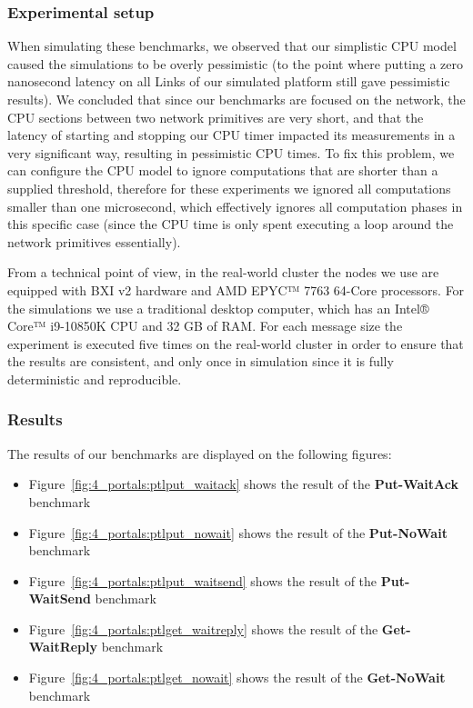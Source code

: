 \subsubsection{Experimental setup}

When simulating these benchmarks, we observed that our simplistic CPU model
caused the simulations to be overly pessimistic (to the point where putting a
zero nanosecond latency on all Links of our simulated platform still gave
pessimistic results). We concluded that since our benchmarks are focused on the
network, the CPU sections between two network primitives are very short, and
that the latency of starting and stopping our CPU timer impacted its
measurements in a very significant way, resulting in pessimistic CPU times. To
fix this problem, we can configure the CPU model to ignore computations that are
shorter than a supplied threshold, therefore for these experiments we ignored
all computations smaller than one microsecond, which effectively ignores all
computation phases in this specific case (since the CPU time is only spent
executing a  loop around the network primitives essentially).

From a technical point of view, in the real-world cluster the nodes we use are
equipped with BXI v2 hardware and AMD EPYC™ 7763 64-Core processors. For the
simulations we use a traditional desktop computer, which has an Intel® Core™
i9-10850K CPU and 32 GB of RAM. For each message size the experiment is executed
five times on the real-world cluster in order to ensure that the results are
consistent, and only once in simulation since it is fully deterministic and
reproducible.

\subsubsection{Results}

The results of our benchmarks are displayed on the following figures:
\begin{itemize}
    \item Figure~\ref{fig:4_portals:ptlput_waitack} shows the result of the
    \textbf{Put-WaitAck} benchmark
    \item Figure~\ref{fig:4_portals:ptlput_nowait} shows the result of the
    \textbf{Put-NoWait} benchmark
    \item Figure~\ref{fig:4_portals:ptlput_waitsend} shows the result of the
    \textbf{Put-WaitSend} benchmark
    \item Figure~\ref{fig:4_portals:ptlget_waitreply} shows the result of the
    \textbf{Get-WaitReply} benchmark
    \item Figure~\ref{fig:4_portals:ptlget_nowait} shows the result of the
    \textbf{Get-NoWait} benchmark
\end{itemize}

